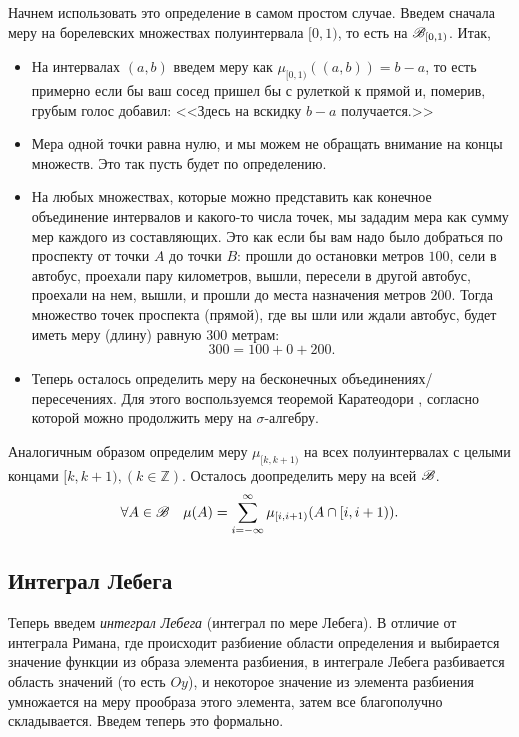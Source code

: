 \documentclass[../TV&MS.tex]{subfiles}
\begin{document}
Начнем использовать это определение в самом простом случае. Введем сначала меру на 
борелевских множествах полуинтервала $[0, 1)$, то есть на $\mathscr{B}_{[0, 1)}$. Итак, 
\begin{itemize}
	\item На интервалах $(a, b)$ введем меру как $\mu_{[0, 1)}((a, b)) = b - a$,
	то есть примерно если бы ваш сосед пришел бы с рулеткой к прямой и, померив, 
	грубым голос добавил: <<Здесь на вскидку $b-a$ получается.>>

	\item Мера одной точки равна нулю, и мы можем не обращать внимание на 
	концы множеств. Это так пусть будет по определению.
	
	\item На любых множествах, которые можно представить как конечное
	объединение интервалов и какого-то числа точек, мы зададим мера как 
	сумму мер каждого из составляющих. Это как если бы вам надо было 
	добраться по проспекту от точки $A$ до точки $B$: прошли до остановки 
	метров $100$, сели в автобус, проехали пару километров, вышли, пересели
	в другой автобус, проехали на нем, вышли, и прошли до места назначения
	метров $200$. Тогда множество точек проспекта (прямой), где вы шли или
	ждали автобус, будет иметь меру (длину) равную $300$ метрам:
	$$300 = 100 + 0 + 200.$$

	\item Теперь осталось определить меру на бесконечных объединениях/пересечениях. 
	Для этого воспользуемся теоремой Каратеодори , согласно 
	которой можно продолжить меру на $\sigma$-алгебру.
\end{itemize}

Аналогичным образом определим меру $\mu_{[k, k+1)}$ на всех полуинтервалах 
с целыми концами $[k, k+1), (k \in \mathbb{Z})$. Осталось доопределить меру на всей 
$\mathscr{B}$.
$$
	\forall A \in \mathscr{B} \quad\mu(A)=\sum\limits_{i=-\infty}^{\infty}\mu_{[i, i+1)}
	(A \cap [i, i+1)).
$$
 
\subsection{Интеграл Лебега} 
 
Теперь введем \emph{интеграл Лебега} (интеграл по мере Лебега). В отличие 
от интеграла Римана, где происходит разбиение области определения и выбирается
значение функции из образа элемента разбиения, в интеграле Лебега разбивается 
область значений (то есть $Oy$), и некоторое значение из элемента разбиения умножается 
на меру прообраза этого элемента, затем все благополучно складывается. Введем теперь 
это формально.
 
\end{document}
